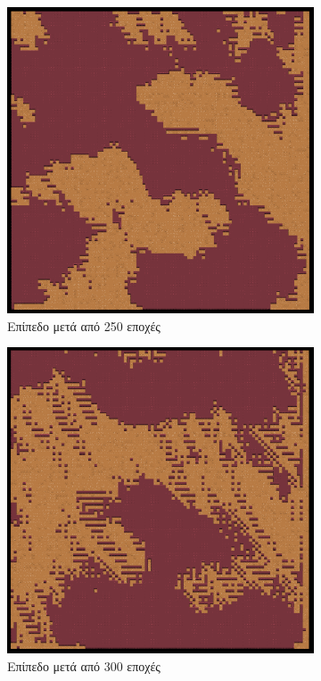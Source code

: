 \begin{figure}[H]
\begin{subfigure}{.5\textwidth}
  \centering
  \includegraphics[width=.8\linewidth]{../images/generated/250.png}
  \caption{Επίπεδο μετά από 250 εποχές}
  \label{fig:sfig1}
\end{subfigure}%
\begin{subfigure}{.5\textwidth}
  \centering
  \includegraphics[width=.8\linewidth]{../images/generated/300.png}
  \caption{Επίπεδο μετά από 300 εποχές}
  \label{fig:sfig2}
\end{subfigure}
\begin{subfigure}{.5\textwidth}

\end{subfigure}
\end{figure}
